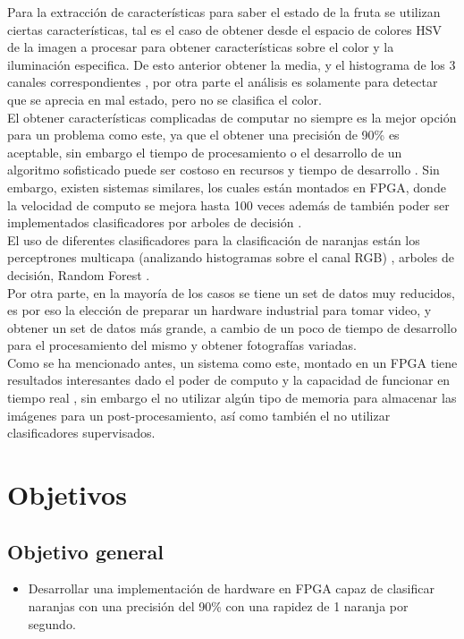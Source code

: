 \documentclass[twoside,spanish,ESP,MSc]{plantillaLabUPV}
\theoremstyle{definition}
\begin{document}
Para la extracción de características para saber el estado de la fruta se utilizan ciertas características, tal es el caso de obtener desde el espacio de colores HSV de la imagen a procesar para obtener características sobre el color y la iluminación especifica. De esto anterior obtener la media, y el histograma de los 3 canales correspondientes \cite{analis,chokun}, por otra parte el análisis es solamente para detectar que se aprecia en mal estado, pero no se clasifica el color.\\

El obtener características complicadas de computar no siempre es la mejor opción para un problema como este, ya que el obtener una precisión de 90\% es aceptable, sin embargo el tiempo de procesamiento o el desarrollo de un algoritmo sofisticado puede ser costoso en recursos y tiempo de desarrollo \cite{curvelet}. Sin embargo, existen sistemas similares, los cuales están montados en FPGA, donde la velocidad de computo se mejora hasta 100 veces \cite{faste} además de también poder ser implementados clasificadores por arboles de decisión \cite{friend}.\\

El uso de diferentes clasificadores para la clasificación de naranjas están los perceptrones multicapa (analizando histogramas sobre el canal RGB) \cite{classi,analis}, arboles de decisión, Random Forest \cite{analis,rfrf}. \\

Por otra parte, en la mayoría de los casos se tiene un set de datos muy reducidos, es por eso la elección de preparar un hardware industrial para tomar video, y obtener un set de datos más grande, a cambio de un poco de tiempo de desarrollo para el procesamiento del mismo y obtener fotografías variadas.\\

Como se ha mencionado antes, un sistema como este, montado en un FPGA tiene resultados interesantes dado el poder de computo y la capacidad de funcionar en tiempo real \cite{josu}, sin embargo el no utilizar algún tipo de memoria para almacenar las imágenes para un post-procesamiento, así como también el no utilizar clasificadores supervisados.


\section{Objetivos}
\subsection*{Objetivo general}
\begin{itemize}
 \item Desarrollar una implementación de hardware en FPGA capaz de clasificar naranjas con una precisión del 90\% con una rapidez de 1 naranja por segundo.
\end{itemize}
\end{document}
